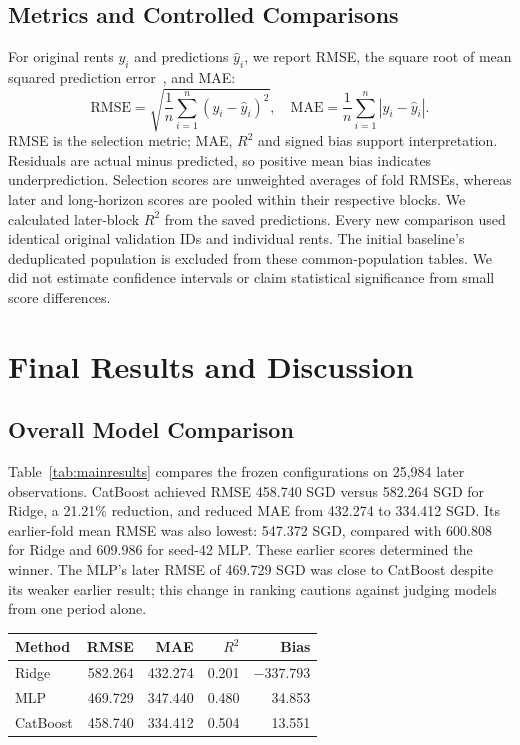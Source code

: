 \documentclass[conference]{IEEEtran}
\makeatletter
\newenvironment{localtable}{\par\addvspace{\medskipamount}\noindent
  \begin{minipage}{\columnwidth}\def\@captype{table}}{\end{minipage}\par
  \addvspace{\medskipamount}}
\makeatother
\begin{document}
\subsection{Metrics and Controlled Comparisons}
For original rents $y_i$ and predictions $\hat y_i$, we report RMSE,
the square root of mean squared prediction error~\cite{rmse_reference},
and MAE:
\begin{equation}
 \mathrm{RMSE}=\sqrt{\frac{1}{n}\sum_{i=1}^{n}(y_i-\hat y_i)^2},
 \quad \mathrm{MAE}=\frac{1}{n}\sum_{i=1}^{n}|y_i-\hat y_i|.
\end{equation}
RMSE is the selection metric; MAE, $R^2$ and signed bias support interpretation.
Residuals are actual minus predicted, so positive mean bias indicates
underprediction. Selection scores are unweighted averages of fold RMSEs,
whereas later and long-horizon scores are pooled within their respective
blocks. We calculated later-block $R^2$ from the saved predictions.
Every new comparison used identical original validation IDs and individual
rents. The initial baseline's deduplicated population is excluded from these
common-population tables. We did not estimate confidence intervals or
claim statistical significance from small score differences.

\section{Final Results and Discussion}
\label{sec:results}

\subsection{Overall Model Comparison}
Table~\ref{tab:mainresults} compares the frozen configurations on 25,984
later observations. CatBoost achieved RMSE 458.740 SGD versus 582.264 SGD
for Ridge, a 21.21\% reduction, and reduced MAE from 432.274 to 334.412 SGD.
Its earlier-fold mean RMSE was also lowest: 547.372 SGD, compared with
600.808 for Ridge and 609.986 for seed-42 MLP. These earlier scores determined
the winner. The MLP's later RMSE of 469.729 SGD was close to CatBoost despite
its weaker earlier result; this change in ranking cautions against judging
models from one period alone.

\begin{localtable}
  \caption{July 2024--March 2025 comparison (25,984 original rows).
  All models use 35 base features. Errors and bias are in SGD.}
  \label{tab:mainresults}
  \centering\small
  \begin{tabularx}{\columnwidth}{Xrrrr}
    \toprule
    Method & RMSE & MAE & $R^2$ & Bias \\
    \midrule
    Ridge & 582.264 & 432.274 & 0.201 & $-337.793$ \\
    MLP & 469.729 & 347.440 & 0.480 & 34.853 \\
    CatBoost & 458.740 & 334.412 & 0.504 & 13.551 \\
    \bottomrule
  \end{tabularx}
\end{localtable}
\end{document}
